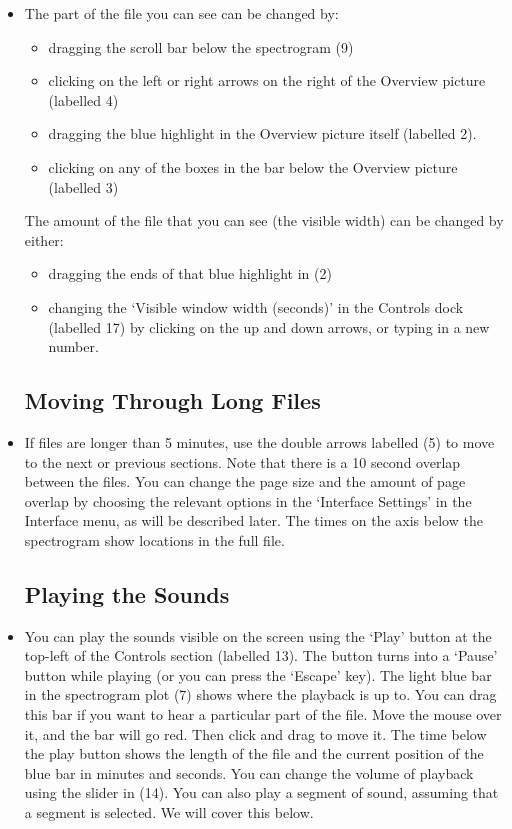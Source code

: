 \documentclass{article}
\begin{document}
\begin{itemize}
\item The part of the file you can see can be changed by:
	\begin{itemize}
	\item dragging the scroll bar below the spectrogram (9)
	\item clicking on the left or right arrows on the right of the Overview picture (labelled 4)
	\item dragging the blue highlight in the Overview picture itself (labelled 2). 
	\item clicking on any of the boxes in the bar below the Overview picture (labelled 3)
	\end{itemize}
	The amount of the file that you can see (the visible width) can be changed by either: 
	\begin{itemize}
	\item dragging the ends of that blue highlight in (2)
	\item changing the `Visible window width (seconds)' in the Controls dock (labelled 17) by clicking on the up and down arrows, or typing in a new number.
	\end{itemize}

\subsection{Moving Through Long Files}

\item If files are longer than 5 minutes, use the double arrows labelled (5) to move to the next or previous sections. Note that there is a 10 second overlap between the files. You can change the page size and the amount of page overlap by choosing the relevant options in the `Interface Settings' in the Interface menu, as will be described later. The times on the axis below the spectrogram show locations in the full file.

\subsection{Playing the Sounds}

\item You can play the sounds visible on the screen using the `Play' button at the top-left of the Controls section (labelled 13). The button turns into a `Pause' button while playing (or you can press the `Escape' key). The light blue bar in the spectrogram plot (7)  shows where the playback is up to. You can drag this bar if you want to hear a particular part of the file. Move the mouse over it, and the bar will go red. Then click and drag to move it. The time below the play button shows the length of the file and the current position of the blue bar in minutes and seconds. You can change the volume of playback using the slider in (14). 
You can also play a segment of sound, assuming that a segment is selected. We will cover this below.


\end{itemize}
\end{document}

